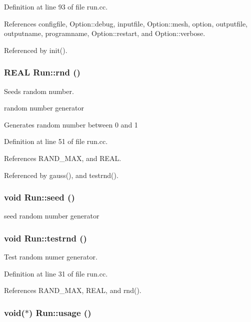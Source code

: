 Definition at line 93 of file run.cc.

References configfile, Option::debug, inputfile, Option::mesh, option, outputfile, outputname, programname, Option::restart, and Option::verbose.

Referenced by init().\hypertarget{namespaceRun_61c4192fdab078a931b0b143c2489a66}{
\subsubsection[{rnd}]{\setlength{\rightskip}{0pt plus 5cm}REAL Run::rnd ()}}
\label{namespaceRun_61c4192fdab078a931b0b143c2489a66}


Seeds random number. 

random number generator

Generates random number between 0 and 1 

Definition at line 51 of file run.cc.

References RAND\_\-MAX, and REAL.

Referenced by gauss(), and testrnd().\hypertarget{namespaceRun_cc78ebcab78e6893272ed9d3c2a550f1}{
\subsubsection[{seed}]{\setlength{\rightskip}{0pt plus 5cm}void Run::seed ()}}
\label{namespaceRun_cc78ebcab78e6893272ed9d3c2a550f1}


seed random number generator 

\hypertarget{namespaceRun_a186b3a7a41e8fe7a5fa65e70577ebfd}{
\subsubsection[{testrnd}]{\setlength{\rightskip}{0pt plus 5cm}void Run::testrnd ()}}
\label{namespaceRun_a186b3a7a41e8fe7a5fa65e70577ebfd}


Test random numer generator. 



Definition at line 31 of file run.cc.

References RAND\_\-MAX, REAL, and rnd().\hypertarget{namespaceRun_ec4aa644c976688fe218a95f27c8430e}{
\subsubsection[{usage}]{\setlength{\rightskip}{0pt plus 5cm}void($\ast$) {\bf Run::usage} ()}}
\label{namespaceRun_ec4aa644c976688fe218a95f27c8430e}




